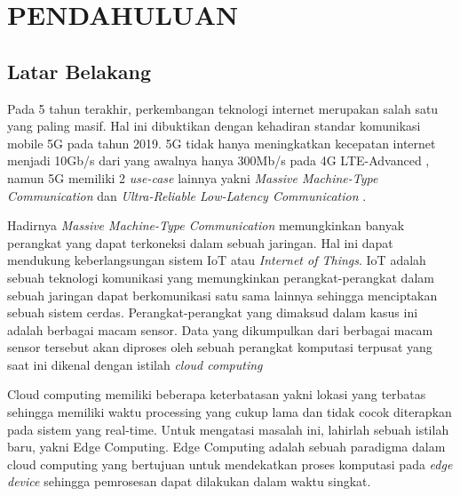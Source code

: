 \chapter{PENDAHULUAN}
\setcounter{page}{1}


\section{Latar Belakang}

Pada 5 tahun terakhir, perkembangan teknologi internet merupakan salah satu yang paling masif.
Hal ini dibuktikan dengan kehadiran standar komunikasi mobile 5G pada tahun 2019. 5G tidak hanya meningkatkan kecepatan internet menjadi
10Gb/s dari yang awalnya hanya 300Mb/s pada 4G LTE-Advanced \citep{4g}, namun 5G memiliki 2 \textit{use-case} lainnya
yakni \textit{Massive Machine-Type Communication} dan \textit{Ultra-Reliable Low-Latency Communication} \citep{5g}. 


Hadirnya \textit{Massive Machine-Type Communication} memungkinkan banyak perangkat yang dapat terkoneksi dalam sebuah jaringan.
Hal ini dapat mendukung keberlangsungan sistem IoT atau \textit{Internet of Things}. IoT adalah sebuah teknologi komunikasi
yang memungkinkan perangkat-perangkat dalam sebuah jaringan dapat berkomunikasi satu sama lainnya sehingga menciptakan sebuah sistem cerdas.
Perangkat-perangkat yang dimaksud dalam kasus ini adalah berbagai macam sensor. Data yang dikumpulkan dari berbagai macam sensor tersebut akan diproses
oleh sebuah perangkat komputasi terpusat yang saat ini dikenal dengan istilah \textit{cloud computing}

Cloud computing memiliki beberapa keterbatasan yakni lokasi yang terbatas sehingga memiliki waktu processing yang cukup lama
dan tidak cocok diterapkan pada sistem yang real-time. Untuk mengatasi masalah ini, lahirlah sebuah istilah baru, yakni Edge Computing.
Edge Computing adalah sebuah paradigma dalam cloud computing yang bertujuan untuk mendekatkan proses komputasi pada \textit{edge device}
sehingga pemrosesan dapat dilakukan dalam waktu singkat.

